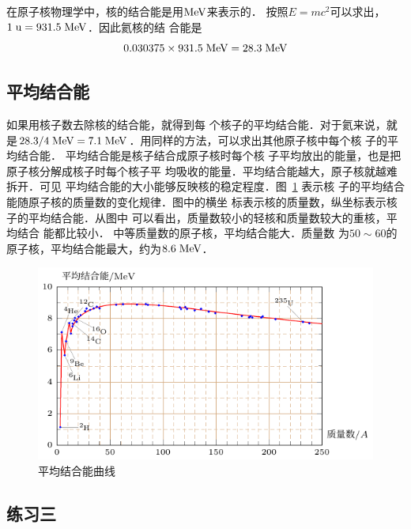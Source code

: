 在原子核物理学中，核的结合能是用$\text{MeV}$来表示的．
按照$E=mc^2$可以求出，$1 \;\text{u}=931.5\;\text{MeV}$．因此氦核的结
合能是
\[0.030375\times 931.5 \;\text{MeV} =28.3\;\text{MeV}\]

\subsection{平均结合能} 

如果用核子数去除核的结合能，就得到每
个核子的平均结合能．对于氦来说，就是$28.3/4 \;\text{MeV} =
7.1 \;\text{MeV} $．用同样的方法，可以求出其他原子核中每个核
子的平均结合能．
平均结合能是核子结合成原子核时每个核
子平均放出的能量，也是把原子核分解成核子时每个核子平
均吸收的能量．平均结合能越大，原子核就越难拆开．可见
平均结合能的大小能够反映核的稳定程度．图~\ref{fig_C_9-11} 表示核
子的平均结合能随原子核的质量数的变化规律．图中的横坐
标表示核的质量数，纵坐标表示核子的平均结合能．从图中
可以看出，质量数较小的轻核和质量数较大的重核，平均结合
能都比较小．
中等质量数的原子核，平均结合能大．质量数
为$50 \sim 60$的原子核，平均结合能最大，约为$8.6 \;\text{MeV}$．

\begin{figure}[htbp]
    \centering
    \includegraphics{fig/C/9-11.pdf}
    \caption{平均结合能曲线}\label{fig_C_9-11}
\end{figure}


\subsection*{练习三}

